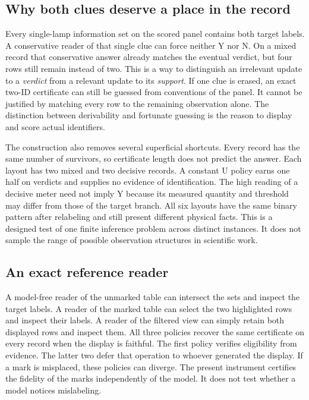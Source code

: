 \documentclass[12pt,letterpaper]{article}
\begin{document}
\subsection{Why both clues deserve a place in the record}

Every single-lamp information set on the scored panel contains both target labels. A conservative reader of that single clue can force neither Y nor N. On a mixed record that conservative answer already matches the eventual verdict, but four rows still remain instead of two. This is a way to distinguish an irrelevant update to a \emph{verdict} from a relevant update to its \emph{support}. If one clue is erased, an exact two-ID certificate can still be guessed from conventions of the panel. It cannot be justified by matching every row to the remaining observation alone. The distinction between derivability and fortunate guessing is the reason to display and score actual identifiers.

The construction also removes several superficial shortcuts. Every record has the same number of survivors, so certificate length does not predict the answer. Each layout has two mixed and two decisive records. A constant U policy earns one half on verdicts and supplies no evidence of identification. The high reading of a decisive meter need not imply Y because its measured quantity and threshold may differ from those of the target branch. All six layouts have the same binary pattern after relabeling and still present different physical facts. This is a designed test of one finite inference problem across distinct instances. It does not sample the range of possible observation structures in scientific work.

\subsection{An exact reference reader}

A model-free reader of the unmarked table can intersect the sets and inspect the target labels. A reader of the marked table can select the two highlighted rows and inspect their labels. A reader of the filtered view can simply retain both displayed rows and inspect them. All three policies recover the same certificate on every record when the display is faithful. The first policy verifies eligibility from evidence. The latter two defer that operation to whoever generated the display. If a mark is misplaced, these policies can diverge. The present instrument certifies the fidelity of the marks independently of the model. It does not test whether a model notices mislabeling.
\end{document}
